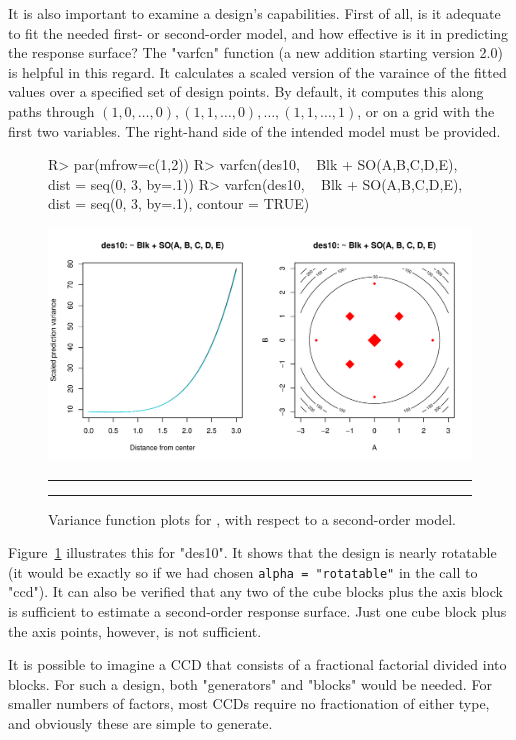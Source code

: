 \documentclass[article,nojss]{jss}
\begin{document}
It is also important to examine a design's capabilities. First of all, is it adequate to fit the needed first- or second-order model, and how effective is it in predicting the response surface? The "varfcn" function (a new addition starting  version 2.0) is helpful in this regard. It calculates a scaled version of the varaince of the fitted values over a specified set of design points. By default, it computes this along paths through $(1,0,\ldots,0),(1,1,\ldots,0),\ldots,(1,1,\ldots,1)$, or on a grid with the first two variables. The right-hand side of the intended model must be provided. 
\begin{figure}
{\small
\begin{Schunk}
\begin{Sinput}
R> par(mfrow=c(1,2))
R> varfcn(des10, ~ Blk + SO(A,B,C,D,E), dist = seq(0, 3, by=.1))
R> varfcn(des10, ~ Blk + SO(A,B,C,D,E), dist = seq(0, 3, by=.1), contour = TRUE)
\end{Sinput}
\end{Schunk}
}
\includegraphics[width=.8\textwidth]{rsm-varfcn.pdf}
\caption{Variance function plots for , with respect to a second-order model.}\label{varfcn}
\rule{18pt}{0pt}\hrule
\end{figure}

Figure~\ref{varfcn} illustrates this for "des10".
It shows that the design is nearly rotatable (it would be exactly so if we had chosen \verb|alpha = "rotatable"| in the call to "ccd").
It can also be verified that any two of the cube blocks plus the axis block is sufficient
to estimate a second-order response surface. Just one cube block plus the axis points, however, is not sufficient.

It is possible to imagine a CCD that consists of a fractional factorial divided into blocks.  For such a design, both "generators" and "blocks" would be needed.  For smaller numbers of factors, most CCDs require no fractionation of either type, and obviously these are simple to generate.
\end{document}

